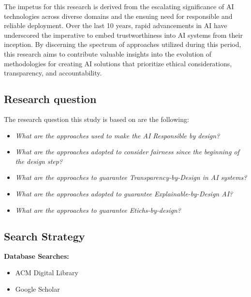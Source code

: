 \documentclass{article}
\begin{document}
The impetus for this research is derived from the escalating significance of AI technologies across diverse domains and the ensuing need for responsible and reliable deployment. Over the last 10 years, rapid advancements in AI have underscored the imperative to embed trustworthiness into AI systems from their inception. By discerning the spectrum of approaches utilized during this period, this research aims to contribute valuable insights into the evolution of methodologies for creating AI solutions that prioritize ethical considerations, transparency, and accountability.

\subsection{Research question}

The research question this study is based on are the following:

\begin{itemize}

    \item \emph{What are the approaches used to make the AI Responsible by design?}

    \item \emph{What are the approaches adopted to consider fairness since the beginning
    of the design step?}

    \item \emph{What are the approaches to guarantee Transparency-by-Design in AI
    systems?}

    \item \emph{What are the approaches adopted to guarantee Explainable-by-Design
    AI?}

    \item \emph{What are the approaches to guarantee Etichs-by-design?}


\end{itemize}

\subsection{Search Strategy}

    \textbf{Database Searches:}

\begin{itemize}

    \item ACM Digital Library

    \item Google Scholar

\end{itemize}
\end{document}
